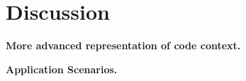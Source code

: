 \section{Discussion}

\textbf{More advanced representation of code context.}

\textbf{Application Scenarios.}
